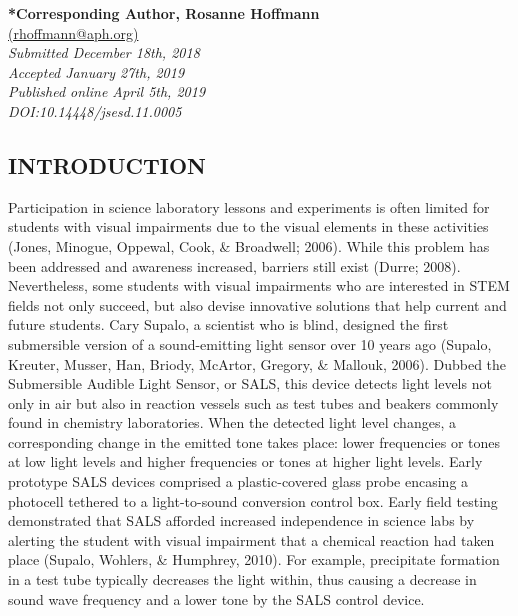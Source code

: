 \documentclass[11.5pt]{sig-alternate} %
\begin{document}
\textbf{*Corresponding Author, Rosanne Hoffmann}\\
\href{mailto: rhoffmann@aph.org }{(rhoffmann@aph.org)} \\
\textit{Submitted  December 18th, 2018}\\
\textit{Accepted January 27th, 2019} \\
\textit{Published online April 5th, 2019} \\
\textit{DOI:10.14448/jsesd.11.0005} \\
\pagebreak
\clearpage
\begin{large}

\section*{INTRODUCTION}
     
Participation in science laboratory lessons and experiments is often limited for students with visual impairments due to the visual elements in these activities (Jones, Minogue, Oppewal, Cook, \& Broadwell; 2006). While this problem has been addressed and awareness increased, barriers still exist (Durre; 2008). Nevertheless, some students with visual impairments who are interested in STEM fields not only succeed, but also devise innovative solutions that help current and future students. Cary Supalo, a scientist who is blind, designed the first submersible version of a sound-emitting light sensor over 10 years ago (Supalo, Kreuter, Musser, Han, Briody, McArtor, Gregory, \& Mallouk, 2006). Dubbed the Submersible Audible Light Sensor, or SALS, this device detects light levels not only in air but also in reaction vessels such as test tubes and beakers commonly found in chemistry laboratories. When the detected light level changes, a corresponding change in the emitted tone takes place: lower frequencies or tones at low light levels and higher frequencies or tones at higher light levels. Early prototype SALS devices comprised a plastic-covered glass probe encasing a photocell tethered to a light-to-sound conversion control box. Early field testing demonstrated that SALS afforded increased independence in science labs by alerting the student with visual impairment that a chemical reaction had taken place (Supalo, Wohlers, \& Humphrey, 2010). For example, precipitate formation in a test tube typically decreases the light within, thus causing a decrease in sound wave frequency and a lower tone by the SALS control device. 


\end{large}
\end{document}
